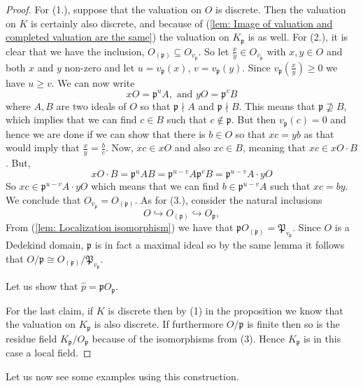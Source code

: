 \documentclass{article}
\newcommand{\mfrak}[1]{\mathfrak{#1}}
\newcommand{\vp}{{v_{\mfrak p}}}
\begin{document}
\begin{proof}
    For (1.), suppose that the valuation on $O$ is discrete. Then the valuation on $K$ is certainly also discrete, and because of (\ref{lem: Image of valuation and completed valuation are the same}) the valuation on $K_\mfrak p$ is as well. For (2.), it is clear that we have the inclusion, $O_{(\mfrak p)} \subseteq O_\vp$. So let $\frac{x}{y} \in O_\vp$ with $x,y \in O$ and both $x$ and $y$ non-zero and let $u = \vp(x)$, $v = \vp(y)$. Since $\vp(\frac{x}{y})  \geq 0$ we have $u \geq v$. We can now write 
    $$x O = \mfrak p^u A, \text{ and } y O = \mfrak p^v B$$
    where $A,B$ are two ideals of $O$ so that $\mfrak p \nmid A$ and $\mfrak p \nmid B$. This means that $\mfrak p \nsupseteq B$, which implies that we can find $c \in B$ such that $c \notin \mfrak p$. But then $\vp(c) = 0$ and hence we are done if we can show that there is $b \in O$ so that $xc = yb$ as that would imply that $\frac{x}{y} = \frac{b}{c}$. Now, $xc \in x O$ and also $xc \in B$, meaning that $xc \in x O \cdot B$. But,
    $$x O \cdot B = \mfrak p^u A B = \mfrak p^{u-v} A \mfrak p^v B = \mfrak p^{u-v} A \cdot y O$$   
    So $xc \in \mfrak p^{u-v} A \cdot y O$ which means that we can find $b \in \mfrak p^{u-v} A$ such that $xc = by$. We conclude that $O_\vp = O_{(\mfrak p)}$.  
    As for (3.), consider the natural inclusions 
    $$O \hookrightarrow O_{(\mfrak p)} \hookrightarrow O_\mfrak p,$$
    From (\ref{lem: Localization isomorphism}) we have that $\mfrak p O_{(\mfrak p)} = \mfrak P_\vp$. Since $O$ is a Dedekind domain, $\mfrak p$ is in fact a maximal ideal so by the same lemma it follows that $O / \mfrak p \cong O_{(\mfrak p)} / \mfrak P_\vp$. 
    
    Let us show that $\hat p = \mfrak p O_\mfrak p$. 

    For the last claim, if $K$ is discrete then by (1) in the proposition we know that the valuation on $K_\mfrak p$ is also discrete. If furthermore $O / \mfrak p$ is finite then so is the residue field $K_\mfrak p / O_\mfrak p$ because of the isomorphisms from (3). Hence $K_\mfrak p$ is in this case a local field.
\end{proof}
    
Let us now see some examples using this construction.
 
\end{document}
